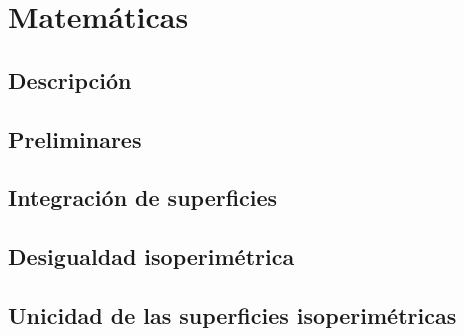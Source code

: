 \documentclass[ oneside,openany,titlepage,numbers=noenddot,headinclude,%
                footinclude=true,cleardoublepage=empty,abstractoff, %
                BCOR=5mm,paper=a4,fontsize=11pt,%
                spanish,american%
                ]{scrreprt}
\begin{document}
\frenchspacing
\raggedbottom
{} %
\pagestyle{plain}
%


\cleardoublepage
\cleardoublepage
\cleardoublepage
\pagestyle{scrheadings}
\cleardoublepage
\cleardoublepage{}
\cleardoublepage

\part{Matemáticas}

\chapter{Descripción}




\chapter{Preliminares}


\chapter{Integración de superficies}


\chapter{Desigualdad isoperimétrica}


\chapter{Unicidad de las superficies isoperimétricas}

\end{document}
